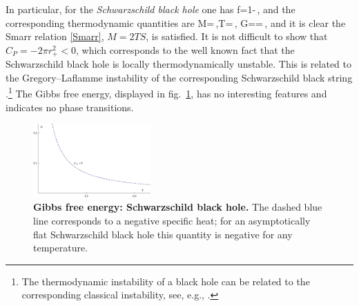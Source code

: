 In particular, for the {\em Schwarzschild black hole} one has
\be
f=1-\,,
\ee
and the corresponding thermodynamic quantities are 
\be
M=\,,\quad T=\,, \quad G==\,,
\ee
and it is clear the Smarr relation \eqref{Smarr}, $M=2TS$, is satisfied.
It is not difficult to show that $C_P=-2 \pi r_+^2<0$, which corresponds to the well known fact that the Schwarzschild black hole is
locally thermodynamically unstable. This is related to the Gregory--Laflamme instability
of the corresponding Schwarzschild black string \cite{GregoryLaflamme:1993}.\footnote{
The thermodynamic instability of a black hole can be related to the corresponding classical instability, see, e.g.,  
\cite{GubserMitra:2000a, GubserMitra:2000b, Reall:2001, Figueras:2011he, Hollands:2012sf}. 
}
The Gibbs free energy, displayed in fig.~\ref{Fig:Gschflat}, has no interesting features and indicates no phase transitions. 
\begin{figure}
\begin{center}
\includegraphics[width=0.4\textwidth,height=0.3\textheight]{Figures/GscF.eps}
\caption{{\bf Gibbs free energy: Schwarzschild black hole.}
The dashed blue line corresponds to a negative specific heat; 
for an asymptotically flat Schwarzschild black hole this quantity is negative for any temperature.
}
\label{Fig:Gschflat}
\end{center}
\end{figure}


